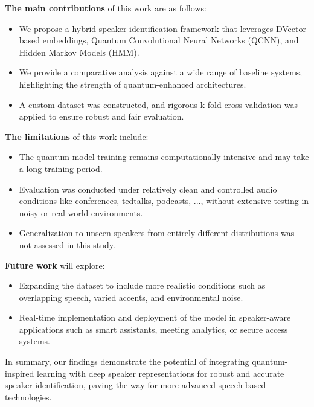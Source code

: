 \documentclass[conference]{IEEEtran}
\begin{document}
\textbf{The main contributions} of this work are as follows:
\begin{itemize}
    \item We propose a hybrid speaker identification framework that leverages DVector-based embeddings, Quantum Convolutional Neural Networks (QCNN), and Hidden Markov Models (HMM).
    \item We provide a comparative analysis against a wide range of baseline systems, highlighting the strength of quantum-enhanced architectures.
    \item A custom dataset was constructed, and rigorous k-fold cross-validation was applied to ensure robust and fair evaluation.
\end{itemize}

\textbf{The limitations} of this work include:
\begin{itemize}
    \item The quantum model training remains computationally intensive and may take a long training period.
    \item Evaluation was conducted under relatively clean and controlled audio conditions like conferences, tedtalks, podcasts, ..., without extensive testing in noisy or real-world environments.
    \item Generalization to unseen speakers from entirely different distributions was not assessed in this study.
\end{itemize}

\textbf{Future work} will explore:
\begin{itemize}
    \item Expanding the dataset to include more realistic conditions such as overlapping speech, varied accents, and environmental noise.
    \item Real-time implementation and deployment of the model in speaker-aware applications such as smart assistants, meeting analytics, or secure access systems.
\end{itemize}

In summary, our findings demonstrate the potential of integrating quantum-inspired learning with deep speaker representations for robust and accurate speaker identification, paving the way for more advanced speech-based technologies.





\end{document}
